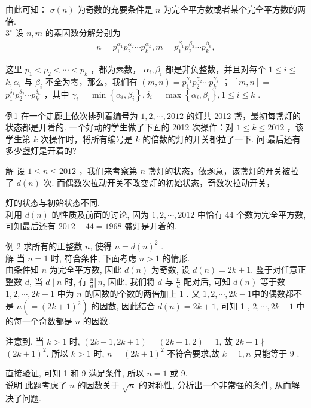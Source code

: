 由此可知： $\sigma(n)$ 为奇数的充要条件是 $n$ 为完全平方数或者某个完全平方数的两倍. \\
$3^{\circ}$ 设 $n ,  m$ 的素因数分解分别为\\
\begin{align*}
n=p_{1}^{\alpha_{1}} p_{2}^{\alpha_{2}} \cdots p_{k}^{\alpha_{k}}, m=p_{1}^{\beta_{1}} p_{2}^{\beta_{2}} \cdots p_{k}^{\beta_{k}},
\end{align*}

这里 $p_{1}<p_{2}<\cdots<p_{k}$ ，都为素数， $\alpha_{i} ,  \beta_{i}$ 都是非负整数，并且对每个 $1 \leqslant i \leqslant$ $k, \alpha_{i}$ 与 $\beta_{i}$ 不全为零，那么，我们有 $(m, n)=p_{1}^{\gamma_{1}} p_{2}^{\gamma_{2}} \cdots p_{k}^{\gamma_{k}}$ ； $[m, n]=$ $p_{1}^{\delta_{1}} p_{2}^{\delta_{2}} \cdots p_{k}^{\delta_{k}}$ ，其中 $\gamma_{i}=\min \left\{\alpha_{i}, \beta_{i}\right\}, \delta_{i}=\max \left\{\alpha_{i}, \beta_{i}\right\}, 1 \leqslant i \leqslant k$ . 

例1 在一个走廊上依次排列着编号为 $1,2, \cdots, 2012$ 的灯共 2012 盏，最初每盏灯的状态都是开着的. 一个好动的学生做了下面的 2012 次操作：对 $1 \leqslant k \leqslant 2012$ ，该学生第 $k$ 次操作时，将所有编号是 $k$ 的倍数的灯的开关都拉了一下. 问:最后还有多少盏灯是开着的?

解 设 $1 \leqslant n \leqslant 2012$ ，我们来考察第 $n$ 盏灯的状态，依题意，该盏灯的开关被拉了 $d(n)$ 次. 而偶数次拉动开关不改变灯的初始状态，奇数次拉动开关，

灯的状态与初始状态不同.\\
利用 $d(n)$ 的性质及前面的讨论, 因为 $1,2, \cdots, 2012$ 中恰有 44 个数为完全平方数, 可知最后还有 $2012-44=1968$ 盛灯是开着的.

例 2 求所有的正整数 $n$, 使得 $n=d(n)^{2}$ . \\
解 当 $n=1$ 时, 符合条件, 下面考虑 $n>1$ 的情形.\\
由条件知 $n$ 为完全平方数, 因此 $d(n)$ 为奇数, 设 $d(n)=2 k+1$. 鉴于对任意正整数 $d$, 当 $d \mid n$ 时, 有 $\left.\frac{n}{d} \right\rvert\, n$, 因此, 我们将 $d$ 与 $\frac{n}{d}$ 配对后, 可知 $d(n)$ 等于数 $1,2, \cdots, 2 k-1$ 中为 $n$ 的因数的个数的两倍加上 1 . 又 $1,2, \cdots, 2 k-1$中的偶数都不是 $n\left(=(2 k+1)^{2}\right)$ 的因数, 因此结合 $d(n)=2 k+1$, 可知 1 , $2, \cdots, 2 k-1$ 中的每一个奇数都是 $n$ 的因数.

注意到, 当 $k>1$ 时, $(2 k-1,2 k+1)=(2 k-1,2)=1$, 故 $2 k-1 \nmid$ $(2 k+1)^{2}$. 所以 $k>1$ 时, $n=(2 k+1)^{2}$ 不符合要求,故 $k=1, n$ 只能等于 9 .

直接验证, 可知 1 和 9 满足条件, 所以 $n=1$ 或 9.\\
说明 此题考虑了 $n$ 的因数关于 $\sqrt{n}$ 的对称性, 分析出一个非常强的条件, 从而解决了问题.

